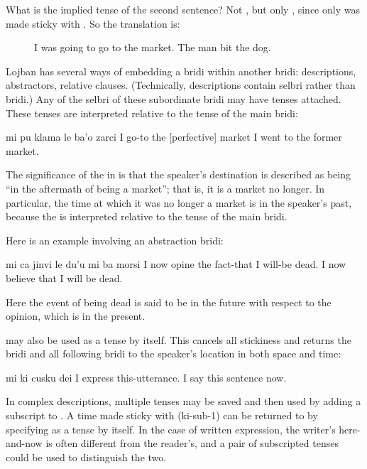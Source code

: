 What is the implied tense of the second sentence? Not
    , but only , since only  was made sticky
    with . So the translation is:
\begin{description}
\item[] I was going to go to the market. The man bit the dog.
\end{description}

Lojban has several ways of embedding a bridi within another
    bridi: descriptions, abstractors, relative clauses.
    (Technically, descriptions contain selbri rather than bridi.)
    Any of the selbri of these subordinate bridi may have tenses
    attached. These tenses are interpreted relative to the tense of
    the main bridi:
\begin{example}
mi pu klama le ba'o zarci\n
I  go-to the [perfective] market\n
I went to the former market.
\end{example}

The significance of the  in  is that the speaker's
    destination is described as being ``in the aftermath of being a
    market''; that is, it is a market no longer. In particular, the
    time at which it was no longer a market is in the speaker's
    past, because the  is interpreted relative to the
     tense of the main bridi.

Here is an example involving an abstraction bridi:
\begin{example}
mi ca jinvi le du'u mi ba morsi\n
I now opine the fact-that I will-be dead.\n
I now believe that I will be dead.
\end{example}

Here the event of being dead is said to be in the future
    with respect to the opinion, which is in the present.

 may also be used as a tense by itself. This cancels
    all stickiness and returns the bridi and all following bridi to
    the speaker's location in both space and time:
\begin{example}
mi ki cusku dei\n
I  express this-utterance.\n
I say this sentence now.
\end{example}

In complex descriptions, multiple tenses may be saved and then
    used by adding a subscript to . A time made sticky with
     (ki-sub-1) can be returned to by specifying
     as a tense by itself. In the case of written
    expression, the writer's here-and-now is often different from
    the reader's, and a pair of subscripted  tenses could be
    used to distinguish the two.



